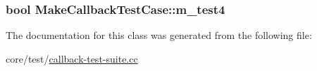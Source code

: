 \subsubsection[{\texorpdfstring{m\+\_\+test4}{m_test4}}]{\setlength{\rightskip}{0pt plus 5cm}bool Make\+Callback\+Test\+Case\+::m\+\_\+test4\hspace{0.3cm}{\ttfamily [private]}}\hypertarget{classMakeCallbackTestCase_ad9e356702447a8d7afb93fbe0ca6c94f}{}\label{classMakeCallbackTestCase_ad9e356702447a8d7afb93fbe0ca6c94f}


The documentation for this class was generated from the following file\+:\begin{DoxyCompactItemize}
\item 
core/test/\hyperlink{callback-test-suite_8cc}{callback-\/test-\/suite.\+cc}\end{DoxyCompactItemize}
